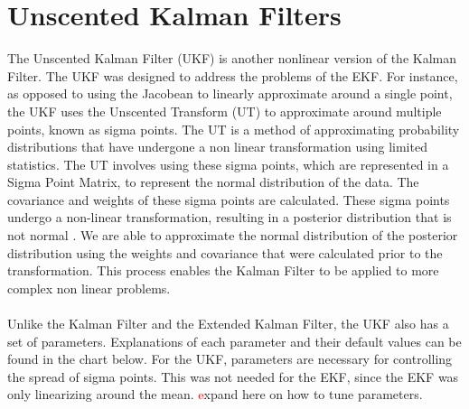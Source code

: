 \chapter{Unscented Kalman Filters}
\label{Unscented Kalman Filters}

The Unscented Kalman Filter (UKF) is another nonlinear version of the Kalman Filter. The UKF was designed to address the problems of the EKF. For instance, as opposed to using the Jacobean to linearly approximate around a single point, the UKF uses the Unscented Transform (UT) to approximate around multiple points, known as sigma points. The UT is a method of approximating probability distributions that have undergone a non linear transformation using limited statistics. The UT involves using these sigma points, which are represented in a Sigma Point Matrix, to represent the normal distribution of the data. The covariance and weights of these sigma points are calculated. These sigma points undergo a non-linear transformation, resulting in a posterior distribution that is not normal \cite{inbook, Wan01theunscented} . We are able to approximate the normal distribution of the posterior distribution using the weights and covariance that were calculated prior to the transformation. This process enables the Kalman Filter to be applied to more complex non linear problems. \\ \\
Unlike the Kalman Filter and the Extended Kalman Filter, the UKF also has a set of parameters. Explanations of each parameter and their default values can be found in the chart below. For the UKF, parameters are necessary for controlling the spread of sigma points. This was not needed for the EKF, since the EKF was only linearizing around the mean.
\textcolor{red} expand here on how to tune parameters.

